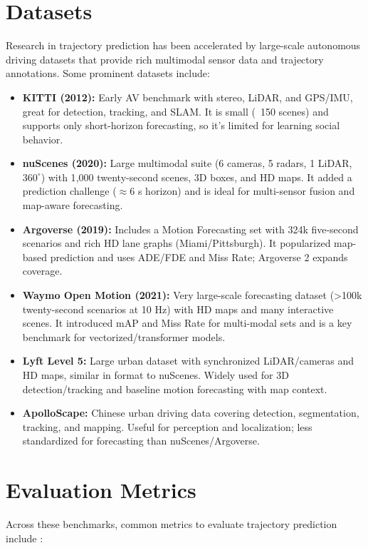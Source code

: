 \documentclass[12pt,a4paper]{report}
\begin{document}
\section{Datasets}

\quad Research in trajectory prediction has been accelerated by large-scale autonomous driving datasets that provide rich multimodal sensor data and trajectory annotations. Some prominent datasets include:

\begin{itemize}
    \item \textbf{KITTI (2012):} Early AV benchmark with stereo, LiDAR, and GPS/IMU, great for detection, tracking, and SLAM. It is small (~150 scenes) and supports only short-horizon forecasting, so it’s limited for learning social behavior. \cite{Geiger2012KITTI}
    \item \textbf{nuScenes (2020):} Large multimodal suite (6 cameras, 5 radars, 1 LiDAR, $360^\circ$) with 1{,}000 twenty-second scenes, 3D boxes, and HD maps. It added a prediction challenge ($\approx 6$ s horizon) and is ideal for multi-sensor fusion and map-aware forecasting. \cite{Caesar2020nuScenes}
    \item \textbf{Argoverse (2019):} Includes a Motion Forecasting set with 324k five-second scenarios and rich HD lane graphs (Miami/Pittsburgh). It popularized map-based prediction and uses ADE/FDE and Miss Rate; Argoverse 2 expands coverage. \cite{Chang2019Argoverse}
    \item \textbf{Waymo Open Motion (2021):} Very large-scale forecasting dataset (>100k twenty-second scenarios at 10 Hz) with HD maps and many interactive scenes. It introduced mAP and Miss Rate for multi-modal sets and is a key benchmark for vectorized/transformer models. \cite{Ettinger2021WOMD}
    \item \textbf{Lyft Level 5:} Large urban dataset with synchronized LiDAR/cameras and HD maps, similar in format to nuScenes. Widely used for 3D detection/tracking and baseline motion forecasting with map context. \cite{Kesten2019Lyft}
    \item \textbf{ApolloScape:} Chinese urban driving data covering detection, segmentation, tracking, and mapping. Useful for perception and localization; less standardized for forecasting than nuScenes/Argoverse. \cite{Huang2018ApolloScape}
    \end{itemize}

\section{Evaluation Metrics}
\quad Across these benchmarks, common metrics to evaluate trajectory prediction include \cite{madjid2025survey,Ettinger2021WOMD}:
\end{document}

